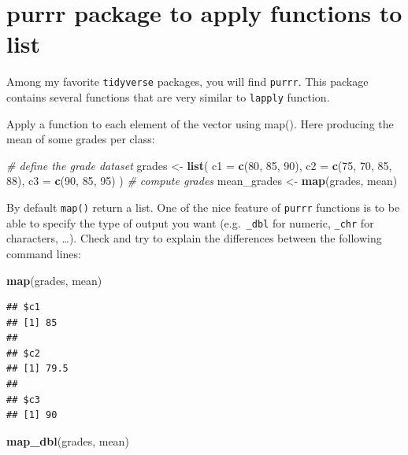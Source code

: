 \documentclass[
]{book}
\newenvironment{Shaded}{\begin{snugshade}}{\end{snugshade}}
\newcommand{\AttributeTok}[1]{\textcolor[rgb]{0.13,0.29,0.53}{#1}}
\newcommand{\CommentTok}[1]{\textcolor[rgb]{0.56,0.35,0.01}{\textit{#1}}}
\newcommand{\DecValTok}[1]{\textcolor[rgb]{0.00,0.00,0.81}{#1}}
\newcommand{\FunctionTok}[1]{\textcolor[rgb]{0.13,0.29,0.53}{\textbf{#1}}}
\newcommand{\NormalTok}[1]{#1}
\newcommand{\OtherTok}[1]{\textcolor[rgb]{0.56,0.35,0.01}{#1}}
\begin{document}
\section{purrr package to apply functions to list}\label{purrr-package-to-apply-functions-to-list}

Among my favorite \texttt{tidyverse} packages, you will find \texttt{purrr}. This package contains
several functions that are very similar to \texttt{lapply} function.

Apply a function to each element of the vector using map(). Here producing the mean of some grades per class:

\begin{Shaded}
\begin{Highlighting}[]
\CommentTok{\# define the grade dataset}
\NormalTok{grades }\OtherTok{\textless{}{-}}
  \FunctionTok{list}\NormalTok{(}
    \AttributeTok{c1 =} \FunctionTok{c}\NormalTok{(}\DecValTok{80}\NormalTok{, }\DecValTok{85}\NormalTok{, }\DecValTok{90}\NormalTok{),}
    \AttributeTok{c2 =} \FunctionTok{c}\NormalTok{(}\DecValTok{75}\NormalTok{, }\DecValTok{70}\NormalTok{, }\DecValTok{85}\NormalTok{, }\DecValTok{88}\NormalTok{),}
    \AttributeTok{c3 =} \FunctionTok{c}\NormalTok{(}\DecValTok{90}\NormalTok{, }\DecValTok{85}\NormalTok{, }\DecValTok{95}\NormalTok{)}
\NormalTok{  )}
\CommentTok{\# compute grades}
\NormalTok{mean\_grades }\OtherTok{\textless{}{-}} \FunctionTok{map}\NormalTok{(grades, mean)}
\end{Highlighting}
\end{Shaded}

By default \texttt{map()} return a list. One of the nice feature of \texttt{purrr} functions is to be able to specify the type of output you want (e.g.~\texttt{\_dbl} for numeric, \texttt{\_chr} for characters, \ldots).
Check and try to explain the differences between the following command lines:

\begin{Shaded}
\begin{Highlighting}[]
\FunctionTok{map}\NormalTok{(grades, mean)}
\end{Highlighting}
\end{Shaded}

\begin{verbatim}
## $c1
## [1] 85
## 
## $c2
## [1] 79.5
## 
## $c3
## [1] 90
\end{verbatim}

\begin{Shaded}
\begin{Highlighting}[]
\FunctionTok{map\_dbl}\NormalTok{(grades, mean)}
\end{Highlighting}
\end{Shaded}
\end{document}
